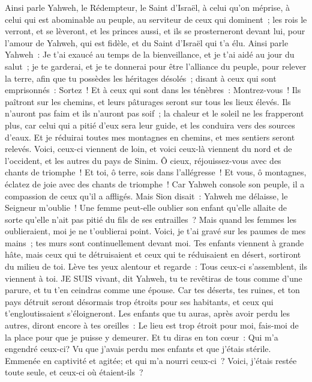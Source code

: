 \begin{multicols}{2}
Ainsi parle Yahweh, le Rédempteur, le Saint d'Israël, à celui qu'on méprise, à celui qui est abominable au peuple, au serviteur de ceux qui dominent~; les rois le verront, et se lèveront, et les princes aussi, et ils se prosterneront devant lui, pour l'amour de Yahweh, qui est fidèle, et du Saint d'Israël qui t'a élu.
Ainsi parle Yahweh~: Je t'ai exaucé au temps de la bienveillance, et je t'ai aidé au jour du salut~; je te garderai, et je te donnerai pour être l'alliance du peuple, pour relever la terre, afin que tu possèdes les héritages désolés~;
disant à ceux qui sont emprisonnés~: Sortez~! Et à ceux qui sont dans les ténèbres~: Montrez-vous~! Ils paîtront sur les chemins, et leurs pâturages seront sur tous les lieux élevés.
Ils n'auront pas faim et ils n'auront pas soif~; la chaleur et le soleil ne les frapperont plus, car celui qui a pitié d'eux sera leur guide, et les conduira vers des sources d'eaux.
Et je réduirai toutes mes montagnes en chemins, et mes sentiers seront relevés.
Voici, ceux-ci viennent de loin, et voici ceux-là viennent du nord et de l'occident, et les autres du pays de Sinim.
Ô cieux, réjouissez-vous avec des chants de triomphe~! Et toi, ô terre, sois dans l'allégresse~! Et vous, ô montagnes, éclatez de joie avec des chants de triomphe~! Car Yahweh console son peuple, il a compassion de ceux qu'il a affligés.
Mais Sion disait~: Yahweh me délaisse, le Seigneur m'oublie~!
Une femme peut-elle oublier son enfant qu'elle allaite de sorte qu'elle n'ait pas pitié du fils de ses entrailles~? Mais quand les femmes les oublieraient, moi je ne t'oublierai point.
Voici, je t'ai gravé sur les paumes de mes mains~; tes murs sont continuellement devant moi.
Tes enfants viennent à grande hâte, mais ceux qui te détruisaient et ceux qui te réduisaient en désert, sortiront du milieu de toi.
Lève tes yeux alentour et regarde~: Tous ceux-ci s'assemblent, ils viennent à toi. JE SUIS vivant, dit Yahweh, tu te revêtiras de tous comme d'une parure, et tu t'en ceindras comme une épouse.
Car tes déserts, tes ruines, et ton pays détruit seront désormais trop étroits pour ses habitants, et ceux qui t'engloutissaient s'éloigneront.
Les enfants que tu auras, après avoir perdu les autres, diront encore à tes oreilles~: Le lieu est trop étroit pour moi, fais-moi de la place pour que je puisse y demeurer.
Et tu diras en ton cœur~: Qui m'a engendré ceux-ci? Vu que j'avais perdu mes enfants et que j'étais stérile. Emmenée en captivité et agitée; et qui m'a nourri ceux-ci~? Voici, j'étais restée toute seule, et ceux-ci où étaient-ils~?

\end{multicols}
